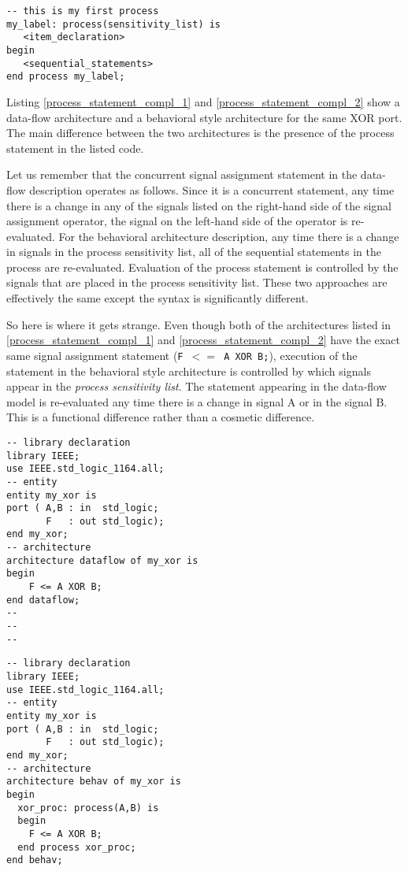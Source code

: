 \begin{lstlisting}[float, label=process_statement, caption=Syntax for the process statement.]
-- this is my first process
my_label: process(sensitivity_list) is
   <item_declaration>
begin
   <sequential_statements>
end process my_label;
\end{lstlisting}

Listing \ref{process_statement_compl_1} and \ref{process_statement_compl_2} show a data-flow architecture and a behavioral style architecture for the same XOR port. The main difference between the two architectures is the presence of the process statement in the listed code. 

Let us remember that the concurrent signal assignment statement in the data-flow description operates as follows. Since it is a concurrent statement, any time there is a change in any of the signals listed on the right-hand side of the signal assignment operator, the signal on the left-hand side of the operator is re-evaluated. For the behavioral architecture description, any time there is a change in signals in the process sensitivity list, all of the sequential statements in the process are re-evaluated. Evaluation of the process statement is controlled by the signals that are placed in the process sensitivity list. These two approaches are effectively the same except the syntax is significantly different. 

So here is where it gets strange. Even though both of the architectures listed in \ref{process_statement_compl_1} and \ref{process_statement_compl_2} have the exact same signal assignment statement (\texttt{F $<=$ A XOR B;}), execution of the statement in the behavioral style architecture is controlled by which signals appear in the \textit{process sensitivity list}. The statement appearing in the data-flow model is re-evaluated any time there is a change in signal A or in the signal B. This is a functional difference rather than a cosmetic difference.

\noindent
\begin{minipage}{0.49\linewidth}
\begin{lstlisting}[label=process_statement_compl_1, caption=Data-flow architecture.]
-- library declaration
library IEEE;
use IEEE.std_logic_1164.all;
-- entity
entity my_xor is
port ( A,B : in  std_logic;
       F   : out std_logic);
end my_xor;
-- architecture
architecture dataflow of my_xor is
begin
	F <= A XOR B;
end dataflow;
--
--
--
\end{lstlisting}
\end{minipage}
\begin{minipage}{0.49\linewidth}
\begin{lstlisting}[label=process_statement_compl_2, caption=Behavioral architecture.]
-- library declaration
library IEEE;
use IEEE.std_logic_1164.all;
-- entity
entity my_xor is
port ( A,B : in  std_logic;
       F   : out std_logic);
end my_xor;
-- architecture
architecture behav of my_xor is
begin
  xor_proc: process(A,B) is
  begin
	F <= A XOR B;
  end process xor_proc;
end behav;

\end{lstlisting}
\end{minipage}

